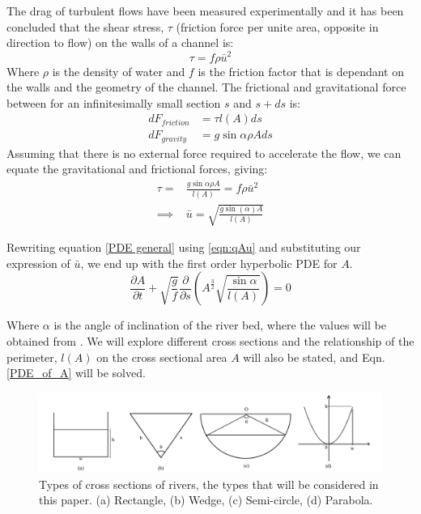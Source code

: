 \documentclass[12pt]{article}
\begin{document}
The drag of turbulent flows have been measured experimentally and it has been concluded that the shear stress, $\tau$ (friction force per unite area, opposite in direction to flow) on the walls of a channel is:
\begin{equation}
    \tau = f \rho \bar{u}^2
\end{equation}
Where $\rho$ is the density of water and $f$ is the friction factor that is dependant on the walls and the geometry of the channel. The frictional and gravitational force between for an infinitesimally small section $s$ and $s + ds$ is:
\begin{equation}
    \begin{split}
        dF_{friction} &= \tau l(A)ds
        \\dF_{gravity} &= g\sin{\alpha}\rho A ds
    \end{split}
\end{equation}
Assuming that there is no external force required to accelerate the flow, we can equate the gravitational and frictional forces, giving:
\begin{equation}
    \begin{split}
        \tau=&\frac{g\sin{\alpha}\rho A}{l(A)}=f\rho\bar{u}^2
       \\ \implies&\bar{u}= \sqrt{\frac{g\sin{(\alpha)A}}{l(A)}}
    \end{split}
\end{equation}

Rewriting equation \ref{PDE general} using \ref{eqn:qAu} and substituting our expression of $\bar{u}$, we end up with the first order hyperbolic PDE for $A$.
\begin{equation}
\label{PDE_of_A}
\boxed{\qquad
    \frac{\partial A}{\partial t} + \sqrt{\frac{g}{f}} \frac{\partial}{\partial s}\left(A^{\frac{3}{2}}\sqrt{\frac{\sin \alpha}{l (A)}}\right) = 0 \qquad
    }
\end{equation}

Where $\alpha$ is the angle of inclination of the river bed, where the values will be obtained from \cite{ROSGEN1994169}. We will explore different cross sections and the relationship of the perimeter, $l(A)$ on the cross sectional area $A$ will also be stated, and Eqn. \ref{PDE_of_A} will be solved.

\begin{figure}[ht]
    \centering
    \includegraphics[width=
\linewidth]{Figures/cross_sections.jpeg}
    \caption{Types of cross sections of rivers, the types that will be considered in this paper. (a) Rectangle, (b) Wedge, (c) Semi-circle, (d) Parabola.}
    \label{fig:cross-sections}
\end{figure}
\end{document}
